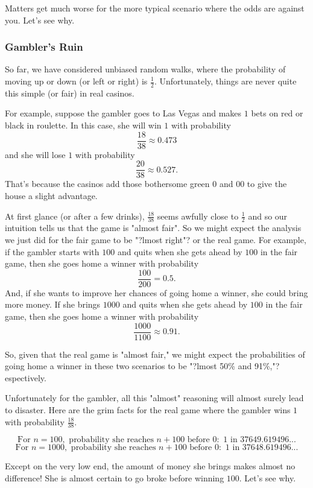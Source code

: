\documentclass[12pt,a4paper]{article}
\begin{document}
		Matters get much worse for the more typical scenario where the odds are against you. Let's see why.
		
		\subsubsection{Gambler's Ruin}
		
		So far, we have considered unbiased random walks, where the probability of moving up or down (or left or right) is $\frac{1}{2}$. Unfortunately, things are never quite this simple (or fair) in real casinos.
		
		For example, suppose the gambler goes to Las Vegas and makes $1$ bets on red or black in roulette. In this case, she will win $1$ with probability
		$$
		\frac{18}{38} \approx 0.473
		$$
		and she will lose $1$ with probability
		$$
		\frac{20}{38} \approx 0.527.
		$$
		That's because the casinos add those bothersome green 0 and 00 to give the house a slight advantage.
		
		At first glance (or after a few drinks), $\frac{18}{38}$ seems awfully close to $\frac{1}{2}$ and so our intuition tells us that the game is "almost fair". So we might expect the analysis we just did for the fair game to be "?lmost right"? or the real game. For example, if the gambler starts with $100$ and quits when she gets ahead by $100$ in the fair game, then she goes home a winner with probability
		$$
		\frac{100}{200} = 0.5.
		$$
		And, if she wants to improve her chances of going home a winner, she could bring more money. If she brings $1000$ and quits when she gets ahead by $100$ in the fair game, then she goes home a winner with probability
		$$
		\frac{1000}{1100} \approx 0.91.
		$$
		
		So, given that the real game is "almost fair," we might expect the probabilities of going home a winner in these two scenarios to be "?lmost 50\% and 91\%,"? espectively.
		
		Unfortunately for the gambler, all this "almost" reasoning will almost surely lead to disaster. Here are the grim facts for the real game where the gambler wins $1$ with probability $\frac{18}{38}$.
		
		$$
		\text{For } n = 100, \text{ probability she reaches } n + 100 \text{ before } 0: \text{ 1 in 37649.619496...}
		$$
		$$
		\text{For } n = 1000, \text{ probability she reaches } n + 100 \text{ before } 0: \text{ 1 in 37648.619496...}
		$$
		
		Except on the very low end, the amount of money she brings makes almost no difference! She is almost certain to go broke before winning $100$. Let's see why.
		
\end{document}
